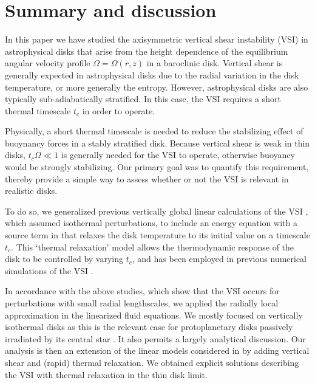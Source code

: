 \section{Summary and discussion}\label{summary}
In this paper we have studied the axisymmetric vertical shear 
instability (VSI) in astrophysical disks that arise from the 
height dependence of the equilibrium angular velocity profile 
$\Omega=\Omega(r,z)$ in a baroclinic disk. Vertical shear is generally
expected in astrophysical disks due to the radial variation in the
disk temperature, or more generally the entropy. However, 
astrophysical disks are also typically sub-adiabatically stratified. 
In this case, the VSI requires a short thermal timescale $t_c$ in
order to operate.  

Physically, a short thermal timescale is needed to reduce the  
stabilizing effect of buoynancy forces in a stably stratified
disk. Because vertical shear is weak in thin disks, $t_c\Omega\ll 1$
is generally needed for the VSI to operate, otherwise buoyancy would
be strongly stabilizing. Our primary goal was to quantify this
requirement, thereby provide a simple way to assess 
whether or not the VSI is relevant in realistic disks. 

To do so, we generalized previous vertically global linear 
calculations of the VSI \citep{nelson13,mcnally14,barker15}, which
assumed isothermal perturbations, to include an energy equation with 
a source term in that relaxes the disk
temperature to its initial value on a timescale
$t_c$. This `thermal relaxation' model allows
the thermodynamic response of the disk to be controlled by varying
$t_c$, and has been employed in previous numerical simulations of the
VSI \citep{nelson13}.  

In accordance with the above studies, which show that the VSI occurs for 
perturbations with small radial lengthscales, we applied the 
radially local approximation in the linearized fluid equations. 
We mostly focused on vertically isothermal disks as 
this is the relevant case for protoplanetary disks passively
irradiated by its central star \citep{chiang97}. It also permits a
largely analytical discussion. Our analysis is then an extension of the
linear models considered in \cite{lubow93} by adding vertical shear
and (rapid) thermal relaxation. We obtained explicit solutions 
describing the VSI with thermal relaxation in the thin disk limit.  

